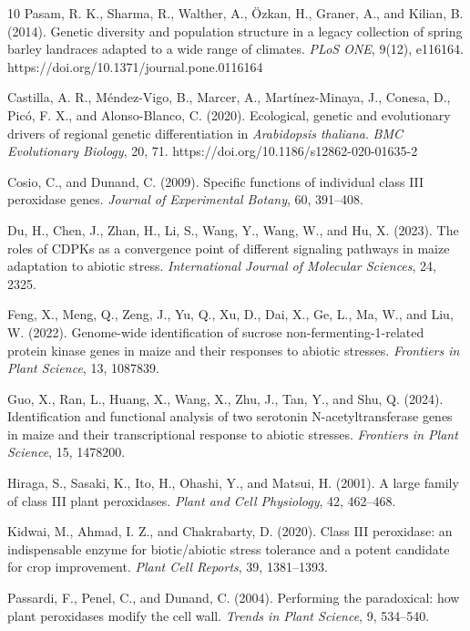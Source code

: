 \documentclass[unnumsec,webpdf,contemporary,large]{oup-authoring-template}%
\theoremstyle{thmstyleone}%
\theoremstyle{thmstyletwo}%
\theoremstyle{thmstylethree}%
\begin{document}
\begin{thebibliography}{10}
Pasam, R. K., Sharma, R., Walther, A., {\"O}zkan, H., Graner, A., and Kilian, B. (2014).
Genetic diversity and population structure in a legacy collection of spring barley landraces adapted to a wide range of climates.
\textit{PLoS ONE}, 9(12), e116164.
https://doi.org/10.1371/journal.pone.0116164

Castilla, A. R., M{\'e}ndez-Vigo, B., Marcer, A., Mart{\'i}nez-Minaya, J., Conesa, D., Pic{\'o}, F. X., and Alonso-Blanco, C. (2020).
Ecological, genetic and evolutionary drivers of regional genetic differentiation in \textit{Arabidopsis thaliana}.
\textit{BMC Evolutionary Biology}, 20, 71.
https://doi.org/10.1186/s12862-020-01635-2

Cosio, C., and Dunand, C. (2009).
Specific functions of individual class III peroxidase genes.
\textit{Journal of Experimental Botany}, 60, 391--408.

Du, H., Chen, J., Zhan, H., Li, S., Wang, Y., Wang, W., and Hu, X. (2023).
The roles of CDPKs as a convergence point of different signaling pathways in maize adaptation to abiotic stress.
\textit{International Journal of Molecular Sciences}, 24, 2325.

Feng, X., Meng, Q., Zeng, J., Yu, Q., Xu, D., Dai, X., Ge, L., Ma, W., and Liu, W. (2022).
Genome-wide identification of sucrose non-fermenting-1-related protein kinase genes in maize and their responses to abiotic stresses.
\textit{Frontiers in Plant Science}, 13, 1087839.

Guo, X., Ran, L., Huang, X., Wang, X., Zhu, J., Tan, Y., and Shu, Q. (2024).
Identification and functional analysis of two serotonin N-acetyltransferase genes in maize and their transcriptional response to abiotic stresses.
\textit{Frontiers in Plant Science}, 15, 1478200.

Hiraga, S., Sasaki, K., Ito, H., Ohashi, Y., and Matsui, H. (2001).
A large family of class III plant peroxidases.
\textit{Plant and Cell Physiology}, 42, 462--468.

Kidwai, M., Ahmad, I. Z., and Chakrabarty, D. (2020).
Class III peroxidase: an indispensable enzyme for biotic/abiotic stress tolerance and a potent candidate for crop improvement.
\textit{Plant Cell Reports}, 39, 1381--1393.

Passardi, F., Penel, C., and Dunand, C. (2004).
Performing the paradoxical: how plant peroxidases modify the cell wall.
\textit{Trends in Plant Science}, 9, 534--540.


\end{thebibliography}
\end{document}

